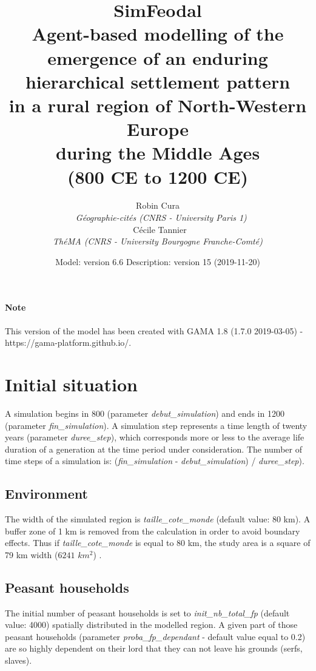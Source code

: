 \documentclass[a4paper,11pt]{article}
\title{\textbf{SimFeodal}\\Agent-based modelling of the emergence of an enduring hierarchical settlement pattern \\ in a rural region of North-Western Europe \\ during the Middle Ages \\ (800 CE to 1200 CE)}
\author{Robin Cura \\\ \small{ \textit{Géographie-cités (CNRS - University Paris 1)}}  \bigskip \\\ Cécile Tannier \\ \small{ \textit{ThéMA (CNRS - University Bourgogne Franche-Comté)}}}
\date{Model: version 6.6\linebreak
	Description: version 15 (2019-11-20)}
\begin{document}
\maketitle


\paragraph{Note}
This version of the model has been created with GAMA 1.8 (1.7.0 2019-03-05) - https://gama-platform.github.io/.


\section{Initial situation}
A simulation begins in 800 (parameter \textit{debut\_simulation}) and ends in 1200 (parameter \textit{fin\_simulation}). A simulation step represents a time length of twenty years (parameter \textit{duree\_step}), which corresponds more or less to the average life duration of a generation at the time period under consideration. The number of time steps of a simulation is: (\textit{fin\_simulation} - \textit{debut\_simulation}) / \textit{duree\_step}).

\subsection{Environment}
\begin{sloppypar}
The width of the simulated region is \textit{taille\_cote\_monde} (default value: 80 km). A buffer zone of 1 km is removed from the calculation in order to avoid boundary effects. Thus if \textit{taille\_cote\_monde} is equal to 80 km, the study area is a square of 79 km width ($6241$ $km^2$) . 
\end{sloppypar}

\subsection{Peasant households}
\begin{sloppypar}
The initial number of peasant households is set to \textit{init\_nb\_total\_fp} (default value: 4000) spatially distributed in the modelled region. A given part of those peasant households (parameter \textit{proba\_fp\_dependant} - default value equal to 0.2) are so highly dependent on their lord that they can not leave his grounds (serfs, slaves).
\end{sloppypar}
\end{document}
